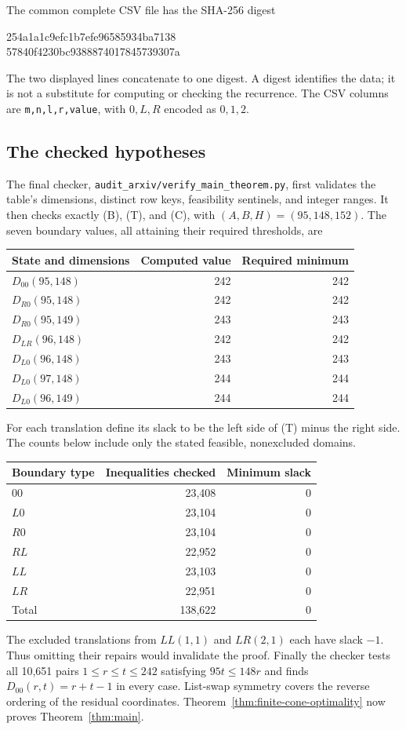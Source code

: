 \documentclass[11pt]{article}
\theoremstyle{definition}
\theoremstyle{remark}
\begin{document}
The common complete CSV file has the SHA-256 digest
\begin{center}\small\ttfamily
254a1a1c9efc1b7efe96585934ba7138\\
57840f4230bc9388874017845739307a
\end{center}
The two displayed lines concatenate to one digest. A digest identifies the
data; it is not a substitute for computing or checking the recurrence.
The CSV columns are \texttt{m,n,l,r,value}, with $0,L,R$ encoded as $0,1,2$.

\subsection{The checked hypotheses}
The final checker, \texttt{audit\_arxiv/verify\_main\_theorem.py}, first
validates the table's dimensions, distinct row keys, feasibility sentinels,
and integer ranges. It then checks exactly (B), (T), and (C), with
$(A,B,H)=(95,148,152)$.
The seven boundary values, all attaining their required thresholds, are
\begin{center}
\begin{tabular}{lrr}
\toprule
State and dimensions & Computed value & Required minimum\\
\midrule
$D_{00}(95,148)$ &242&242\\
$D_{R0}(95,148)$ &242&242\\
$D_{R0}(95,149)$ &243&243\\
$D_{LR}(96,148)$ &242&242\\
$D_{L0}(96,148)$ &243&243\\
$D_{L0}(97,148)$ &244&244\\
$D_{L0}(96,149)$ &244&244\\
\bottomrule
\end{tabular}
\end{center}
For each translation define its slack to be the left side of (T) minus
the right side. The counts below include only the stated feasible,
nonexcluded domains.
\begin{center}
\begin{tabular}{lrr}
\toprule
Boundary type & Inequalities checked & Minimum slack\\
\midrule
$00$ &23,408&0\\
$L0$ &23,104&0\\
$R0$ &23,104&0\\
$RL$ &22,952&0\\
$LL$ &23,103&0\\
$LR$ &22,951&0\\
\midrule
Total&138,622&0\\
\bottomrule
\end{tabular}
\end{center}
The excluded translations from $LL(1,1)$ and $LR(2,1)$ each have slack
$-1$. Thus omitting their repairs would invalidate the proof.
Finally the checker tests all 10,651 pairs
$1\le r\le t\le242$ satisfying $95t\le148r$ and finds
$D_{00}(r,t)=r+t-1$ in every case. List-swap symmetry covers the reverse
ordering of the residual coordinates.
Theorem~\ref{thm:finite-cone-optimality} now proves
Theorem~\ref{thm:main}.
\end{document}
